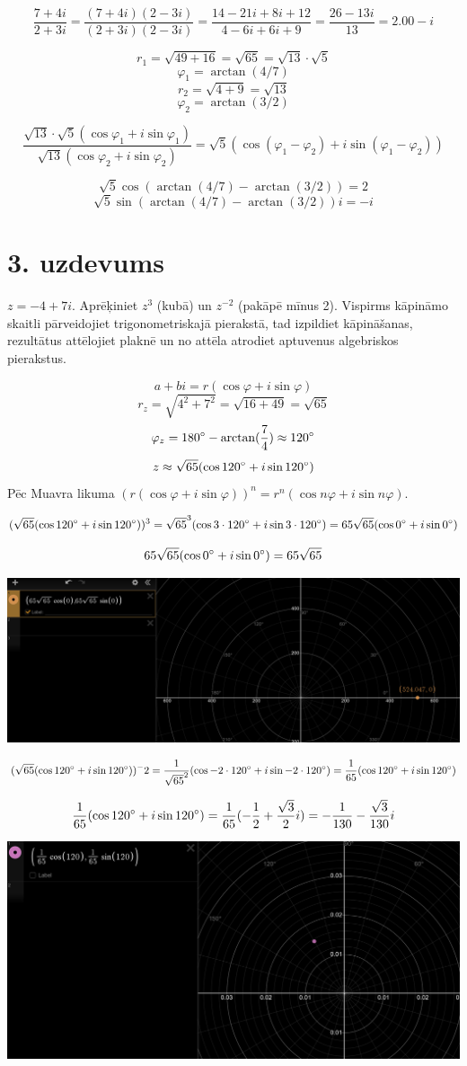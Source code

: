 \documentclass{article}
\begin{document}
$$\frac{7+4i}{2+3i} = \frac{(7+4i)(2-3i)}{(2+3i)(2-3i)} = \frac{14-21i+8i+12}{4-6i+6i+9} = \frac{26-13i}{13} = 2.00-i$$

$$r_1 = \sqrt{49+16} = \sqrt{65}=\sqrt{13}\cdot\sqrt{5}$$
$$\varphi_1 = \arctan{(4/7)}$$
$$r_2 = \sqrt{4+9} = \sqrt{13}$$
$$\varphi_2 = \arctan{(3/2)}$$

$$\frac{\sqrt{13}\cdot\sqrt{5}(\cos\varphi_1+i\sin\varphi_1)}{\sqrt{13}(\cos\varphi_2+i\sin\varphi_2)} = \sqrt{5}(\cos(\varphi_1-\varphi_2)+i\sin(\varphi_1-\varphi_2))$$

$$\sqrt{5}\cos(\arctan(4/7)-\arctan(3/2)) = 2$$
$$\sqrt{5}\sin(\arctan(4/7)-\arctan(3/2))i = -i$$

\section*{3. uzdevums}
$z=-4+7i$. Aprēķiniet $z^3$ (kubā) un $z^{-2}$ (pakāpē mīnus 2). Vispirms kāpināmo skaitli pārveidojiet trigonometriskajā pierakstā, tad izpildiet kāpināšanas, rezultātus attēlojiet plaknē un no attēla atrodiet aptuvenus algebriskos pierakstus.

$$a+bi = r(\cos\varphi+i\sin\varphi)$$
$$ r_z = \sqrt{4^2+7^2} =  \sqrt{16+49} = \sqrt{65}$$
$$ \varphi_z = 180\degree - \arctan(\frac{7}{4}) \approx 120\degree$$
$$z \approx\sqrt{65}(\cos120\degree+i\sin120\degree)$$
Pēc Muavra likuma $(r(\cos \varphi + i \sin \varphi))^n=r^n(\cos n\varphi + i \sin n\varphi)$.

$$(\sqrt{65}(\cos120\degree+i\sin120\degree))^3 = \sqrt{65}^3(\cos3\cdot120\degree+i\sin3\cdot120\degree)= 65\sqrt{65}(\cos0\degree + i\sin0\degree)$$

$$65\sqrt{65}(\cos0\degree + i\sin0\degree)=65\sqrt{65}$$

\includegraphics[width=\textwidth]{2}

$$(\sqrt{65}(\cos120\degree+i\sin120\degree))^-2 = \frac{1}{\sqrt{65}^2}(\cos-2\cdot120\degree+i\sin-2\cdot120\degree)= \frac{1}{65}(\cos120\degree + i\sin120\degree)$$

$$\frac{1}{65}(\cos120\degree + i\sin120\degree)=\frac{1}{65}(-\frac{1}{2}+\frac{\sqrt{3}}{2}i) = -\frac{1}{130}-\frac{\sqrt{3}}{130}i$$

\includegraphics[width=\textwidth]{3}
\end{document}
